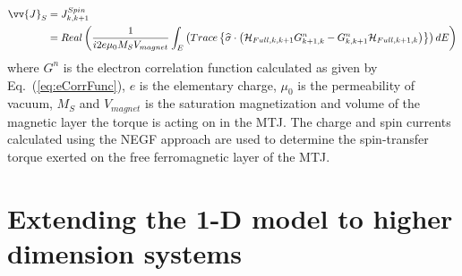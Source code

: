 \begin{equation}\label{eq:negf_js}\begin{aligned}
\vv{J}_{S} &= J_{k,k+1}^{Spin} \\
&= Real \left(\frac{1}{i2e\mu_{0}M_{S}V_{magnet}} \int_{E} \left( Trace \left\lbrace \widehat{\sigma} \cdot \left(\mathcal{H}_{Full,k,k+1}G_{k+1,k}^n - G_{k,k+1}^n\mathcal{H}_{Full,k+1,k} \right)\right\rbrace\right) dE \right)
\end{aligned}\end{equation} where $G^n$ is the electron correlation function calculated as given by Eq.~(\ref{eq:eCorrFunc}), $e$ is the elementary charge, $\mu_{0}$ is the permeability of vacuum, $M_{S}$ and $V_{magnet}$ is the saturation magnetization and volume of the magnetic layer the torque is acting on in the MTJ. The charge and spin currents calculated using the NEGF approach are used to determine the spin-transfer torque exerted on the free ferromagnetic layer of the MTJ.

\section{Extending the 1-D model to higher dimension systems}\label{sec:extendDim}

